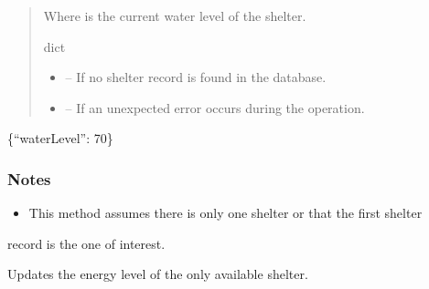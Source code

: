 \documentclass[letterpaper,10pt,english]{sphinxmanual}
\begin{document}
\begin{fulllineitems}
\begin{fulllineitems}
\begin{quote}
\begin{description}
\begin{description}
\begin{itemize}
\end{itemize}

\sphinxAtStartPar
Where  is the current water level of the shelter.

\end{description}


\sphinxAtStartPar
dict

\begin{itemize}
\item {} 
\sphinxAtStartPar
{} – If no shelter record is found in the database.

\item {} 
\sphinxAtStartPar
{} – If an unexpected error occurs during the operation.

\end{itemize}

\end{description}\end{quote}
\begin{description}
\sphinxAtStartPar
\{“waterLevel”: 70\}

\end{description}
\subsubsection*{Notes}
\begin{itemize}
\item {} 
\sphinxAtStartPar
This method assumes there is only one shelter or that the first shelter

\end{itemize}

\sphinxAtStartPar
record is the one of interest.

\end{fulllineitems}


\begin{fulllineitems}
\label{\detokenize{app.controllers:app.controllers.shelter_controller.ShelterController.updateShelterEnergyLevel}}
\pysigstartsignatures
\pysiglinewithargsret
{}
{\sphinxparamcomma {}}
{}
\pysigstopsignatures
\sphinxAtStartPar
Updates the energy level of the only available shelter.


\end{fulllineitems}
\end{fulllineitems}
\end{document}
